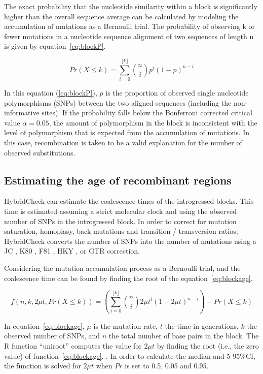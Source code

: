 The exact probability that the nucleotide similarity within a block is significantly higher than the overall sequence average can be calculated by modeling the accumulation of mutations as a Bernoulli trial. The probability of observing k or fewer mutations in a nucleotide sequence alignment of two sequences of length n is given by equation~\ref{eq:blockP}.

\begin{equation}
	\label{eq:blockP}
	Pr(X \leq k) = \sum_{i = 0}^{\lfloor k \rfloor} \binom{n}{i}p^i(1-p)^{n-i}
\end{equation}

In this equation (\ref{eq:blockP}), $p$ is the proportion of observed single nucleotide polymorphisms (SNPs) between the two aligned sequences (including the non-informative sites). If the probability falls below the Bonferroni corrected critical value $\alpha = 0.05$, the amount of polymorphism in the block is inconsistent with the level of polymorphism that is expected from the accumulation of mutations. In this case, recombination is taken to be a valid explanation for the number of observed substitutions.

\subsection{Estimating the age of recombinant regions}
HybridCheck can estimate the coalescence times of the introgressed blocks. This time is estimated assuming a strict molecular clock and using the observed number of SNPs in the introgressed block. In order to correct for mutation saturation, homoplasy, back mutations and transition / transversion ratios, HybridCheck converts the number of SNPs into the number of mutations using a JC \parencite{Jukes1969}, K80 \parencite{Kimura1980ASequences}, F81 \parencite{Felsenstein1981EvolutionaryApproach}, HKY \parencite{Hasegawa1985DatingDNA}, or GTR \parencite{Tavare1986SomeSequences} correction.

Considering the mutation accumulation process as a Bernoulli trial, and the coalescence time can be found by finding the root of the equation~\ref{eq:blockage}.

\begin{equation}
	\label{eq:blockage}
	f(n,k,2μt,Pr(X \leq k)) = \left( \sum_{i=0}^{\lfloor k \rfloor} \binom{n}{i}{2\mu t}^i (1-2\mu t)^{n-i} \right) - Pr(X\leq k)
\end{equation}

In equation~\ref{eq:blockage}, $\mu$ is the mutation rate, $t$ the time in generations, $k$ the observed number of SNPs, and $n$ the total number of base pairs in the block. 
The R function “uniroot” computes the value for $2\mu t$ by finding the root (i.e., the zero value) of function~\ref{eq:blockage}. \parencite{Brent1973AlgorithmsDerivatives}. In order to calculate the median and 5-95\%CI, the function is solved for $2\mu t$ when $Pr$ is set to 0.5, 0.05 and 0.95.


